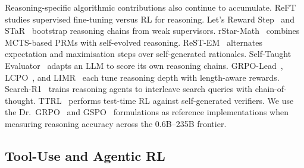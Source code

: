 Reasoning-specific algorithmic contributions also continue to accumulate.
ReFT~\cite{luong2024reft} studies supervised fine-tuning versus RL for
reasoning. Let's Reward Step~\cite{zhang2025rewardstep} and
STaR~\cite{zelikman2022star} bootstrap reasoning chains from weak
supervisors. rStar-Math~\cite{guan2025rstarmath} combines MCTS-based PRMs
with self-evolved reasoning. ReST-EM~\cite{singh2024restem} alternates
expectation and maximisation steps over self-generated rationales.
Self-Taught Evaluator~\cite{wang2024stevaluator} adapts an LLM to score its
own reasoning chains. GRPO-Lead~\cite{lu2025grpolead}, LCPO~\cite{lu2025lcpo},
and LIMR~\cite{li2025limr} each tune reasoning depth with length-aware
rewards. Search-R1~\cite{jin2025searchr1} trains reasoning agents to
interleave search queries with chain-of-thought. TTRL~\cite{pu2025ttrl}
performs test-time RL against self-generated verifiers. We use the
Dr.~GRPO~\cite{tong2025drgrpo} and GSPO~\cite{qwen2025gspo} formulations as
reference implementations when measuring reasoning accuracy across the
0.6B--235B frontier.

\subsection{Tool-Use and Agentic RL}
\label{sec:related:tooluse}

